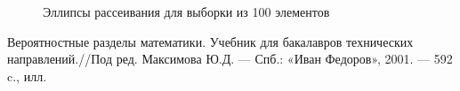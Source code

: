 \documentclass[12pt,a4paper]{article}
\begin{document}
{\begin{figure}[htp]
\begin{minipage}[h]{0.25\linewidth}
				\end{minipage}
				\caption{Эллипсы рассеивания для выборки из 100 элементов}
				\label{ellipse_100}
			\end{figure}
		}
	\clearpage
	\newpage
	
	\begin{flushleft}
		\begin{thebibliography}{1}
			  Вероятностные разделы математики. Учебник для бакалавров технических направлений.//Под ред. Максимова Ю.Д. — Спб.: «Иван Федоров»,
			2001. — 592 c., илл.
		\end{thebibliography}
	\end{flushleft}
	
\end{document}
